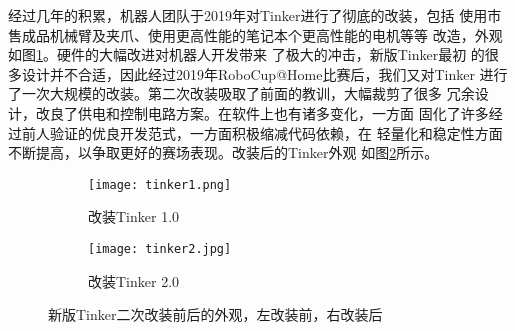 经过几年的积累，机器人团队于2019年对Tinker进行了彻底的改装，包括
使用市售成品机械臂及夹爪、使用更高性能的笔记本个更高性能的电机等等
改造，外观如图\ref{fig:tinker1}。硬件的大幅改进对机器人开发带来
了极大的冲击，新版Tinker最初
的很多设计并不合适，因此经过2019年RoboCup@Home比赛后，我们又对Tinker
进行了一次大规模的改装。第二次改装吸取了前面的教训，大幅裁剪了很多
冗余设计，改良了供电和控制电路方案。在软件上也有诸多变化，一方面
固化了许多经过前人验证的优良开发范式，一方面积极缩减代码依赖，在
轻量化和稳定性方面不断提高，以争取更好的赛场表现。改装后的Tinker外观
如图\ref{fig:tinker2}所示。

\begin{figure}
\centering
\begin{subfigure}{.5\textwidth}
  \centering
  \texttt{[image: tinker1.png]}
  \caption{改装Tinker 1.0}
  \label{fig:tinker1}
\end{subfigure}%
\begin{subfigure}{.5\textwidth}
  \centering
  \texttt{[image: tinker2.jpg]}
  \caption{改装Tinker 2.0}
  \label{fig:tinker2}
\end{subfigure}
\caption{新版Tinker二次改装前后的外观，左改装前，右改装后}
\label{fig:tinker_new}
\end{figure}














